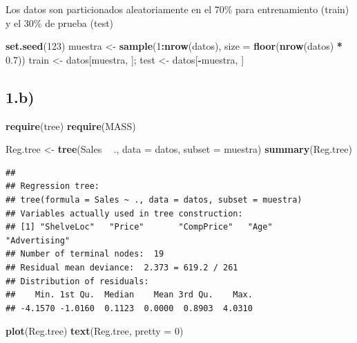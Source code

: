 \documentclass[
]{article}
\newenvironment{Shaded}{\begin{snugshade}}{\end{snugshade}}
\newcommand{\DataTypeTok}[1]{\textcolor[rgb]{0.13,0.29,0.53}{#1}}
\newcommand{\DecValTok}[1]{\textcolor[rgb]{0.00,0.00,0.81}{#1}}
\newcommand{\FloatTok}[1]{\textcolor[rgb]{0.00,0.00,0.81}{#1}}
\newcommand{\KeywordTok}[1]{\textcolor[rgb]{0.13,0.29,0.53}{\textbf{#1}}}
\newcommand{\NormalTok}[1]{#1}
\newcommand{\OperatorTok}[1]{\textcolor[rgb]{0.81,0.36,0.00}{\textbf{#1}}}
\newcommand{\StringTok}[1]{\textcolor[rgb]{0.31,0.60,0.02}{#1}}
\begin{document}
Los datos son particionados aleatoriamente en el 70\% para entrenamiento
(train) y el 30\% de prueba (test)

\begin{Shaded}
\begin{Highlighting}[]
\KeywordTok{set.seed}\NormalTok{(}\DecValTok{123}\NormalTok{)}
\NormalTok{muestra <-}\StringTok{ }\KeywordTok{sample}\NormalTok{(}\DecValTok{1}\OperatorTok{:}\KeywordTok{nrow}\NormalTok{(datos), }\DataTypeTok{size =} \KeywordTok{floor}\NormalTok{(}\KeywordTok{nrow}\NormalTok{(datos) }\OperatorTok{*}\StringTok{ }\FloatTok{0.7}\NormalTok{))}
\NormalTok{train <-}\StringTok{ }\NormalTok{datos[muestra, ]; test <-}\StringTok{ }\NormalTok{datos[}\OperatorTok{-}\NormalTok{muestra, ]}
\end{Highlighting}
\end{Shaded}

\hypertarget{b}{%
\subsection{1.b)}\label{b}}

\begin{Shaded}
\begin{Highlighting}[]
\KeywordTok{require}\NormalTok{(tree)}
\KeywordTok{require}\NormalTok{(MASS)}

\NormalTok{Reg.tree <-}\StringTok{ }\KeywordTok{tree}\NormalTok{(Sales }\OperatorTok{~}\StringTok{ }\NormalTok{., }\DataTypeTok{data =}\NormalTok{ datos, }\DataTypeTok{subset =}\NormalTok{ muestra)}
\KeywordTok{summary}\NormalTok{(Reg.tree)}
\end{Highlighting}
\end{Shaded}

\begin{verbatim}
## 
## Regression tree:
## tree(formula = Sales ~ ., data = datos, subset = muestra)
## Variables actually used in tree construction:
## [1] "ShelveLoc"   "Price"       "CompPrice"   "Age"         "Advertising"
## Number of terminal nodes:  19 
## Residual mean deviance:  2.373 = 619.2 / 261 
## Distribution of residuals:
##    Min. 1st Qu.  Median    Mean 3rd Qu.    Max. 
## -4.1570 -1.0160  0.1123  0.0000  0.8903  4.0310
\end{verbatim}

\begin{Shaded}
\begin{Highlighting}[]
\KeywordTok{plot}\NormalTok{(Reg.tree)}
\KeywordTok{text}\NormalTok{(Reg.tree, }\DataTypeTok{pretty =} \DecValTok{0}\NormalTok{)}
\end{Highlighting}
\end{Shaded}
\end{document}
